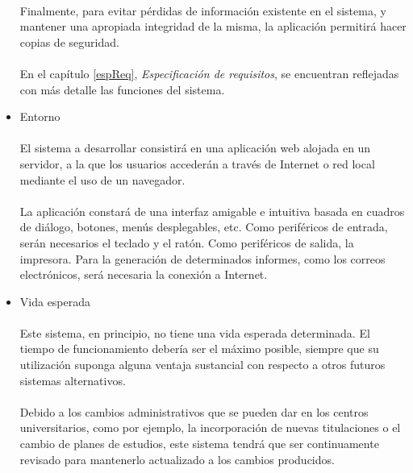 \begin{itemize}
   \paragraph{}Finalmente, para evitar pérdidas de información existente
   en el sistema, y mantener una apropiada integridad de la misma, la aplicación
   permitirá hacer copias de seguridad.

   \paragraph{}En el capítulo \ref{espReq}, \textit{Especificación de
   requisitos}, se encuentran reflejadas con más detalle las funciones del
   sistema.

 \item Entorno

   \paragraph{}El sistema a desarrollar consistirá en una aplicación web alojada
   en un servidor, a la que los usuarios accederán a través de Internet o red
   local mediante el uso de un navegador.

   \paragraph{}La aplicación constará de una interfaz amigable e
   intuitiva basada en cuadros de diálogo, botones, menús desplegables, etc.
   Como periféricos de entrada, serán necesarios el teclado y el ratón. Como
   periféricos de salida, la impresora. Para la generación de determinados
   informes, como los correos electrónicos, será necesaria la conexión a
   Internet.

 \item Vida esperada

   \paragraph{}Este sistema, en principio, no tiene una vida esperada
   determinada. El tiempo de funcionamiento debería ser el máximo posible,
   siempre que su utilización suponga alguna ventaja sustancial con respecto a
   otros futuros sistemas alternativos.

   \paragraph{}Debido a los cambios administrativos que se pueden dar en los
   centros universitarios, como por ejemplo, la incorporación de nuevas
   titulaciones o el cambio de planes de estudios, este sistema tendrá que ser
   continuamente revisado para mantenerlo actualizado a los cambios producidos.


\end{itemize}
